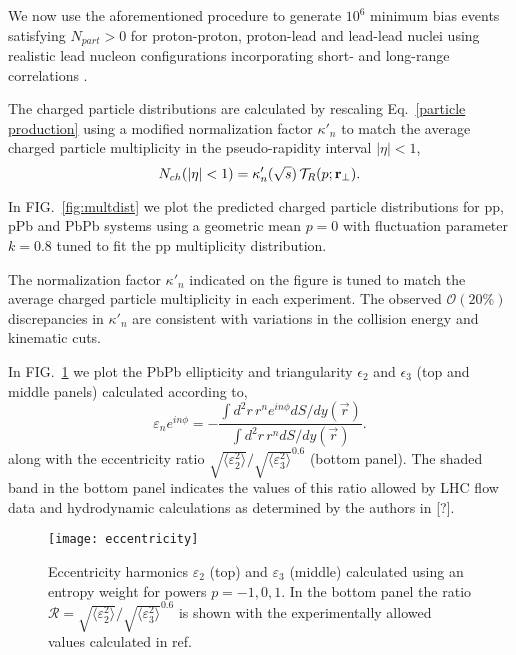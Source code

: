 \documentclass[aps,prl,reprint,amsmath,nofootinbib]{revtex4-1}
\begin{document}
We now use the aforementioned procedure to generate $10^6$ minimum bias events satisfying $N_{part} > 0$ for
proton-proton, proton-lead and lead-lead nuclei using realistic lead nucleon configurations incorporating
short- and long-range correlations \cite{nucleon-correlations}.

The charged particle distributions are calculated by rescaling Eq.~\eqref{particle production} using a
modified normalization factor $\kappa'_n$ to match the average charged particle multiplicity in the
pseudo-rapidity interval $|\eta| < 1$,
\begin{equation}
  N_{ch}(|\eta|<1) = \kappa'_n(\sqrt{s})\, \mathcal{T}_R(p;{\bf r}_\perp).
\end{equation}

In FIG.~\ref{fig:multdist} we plot the predicted charged particle distributions for pp, pPb and PbPb systems
using a geometric mean $p=0$ with fluctuation parameter $k=0.8$ tuned to fit the pp multiplicity
distribution.

The normalization factor $\kappa'_n$ indicated on the figure is tuned to match the average charged particle
multiplicity in each experiment. The observed $\mathcal{O}(20\%)$ discrepancies in $\kappa'_n$ are consistent
with variations in the collision energy and kinematic cuts.

In FIG.~\ref{fig:eccen} we plot the PbPb ellipticity and triangularity $\epsilon_2$ and $\epsilon_3$ (top
and middle panels) calculated according to,
\begin{equation}
  \varepsilon_n e^{i n\phi} = -\frac{\int d^2r\, r^n e^{i n \phi} dS/dy(\vec{r})}{\int d^2r\, r^n dS/dy(\vec{r})}.
\end{equation}
along with the eccentricity ratio $\sqrt{\langle \varepsilon_2^2 \rangle}/\sqrt{\langle \varepsilon_3^2
\rangle}^{0.6}$ (bottom panel). The shaded band in the bottom panel indicates the values of this ratio allowed
by LHC flow data and hydrodynamic calculations as determined by the authors in [?].

\begin{figure}[t]
  \texttt{[image: eccentricity]}
  \caption{\label{fig:eccen}Eccentricity harmonics $\varepsilon_2$ (top) and $\varepsilon_3$ (middle)
  calculated using an entropy weight for powers $p=-1,0,1$.  In the bottom panel the ratio $\mathcal{R} =
  \sqrt{\langle \varepsilon_2^2 \rangle}/\sqrt{\langle \varepsilon_3^2 \rangle}^{0.6}$ is shown with the
  experimentally allowed values calculated in ref.\ \cite{constraining-ic}}
\end{figure}
\end{document}
